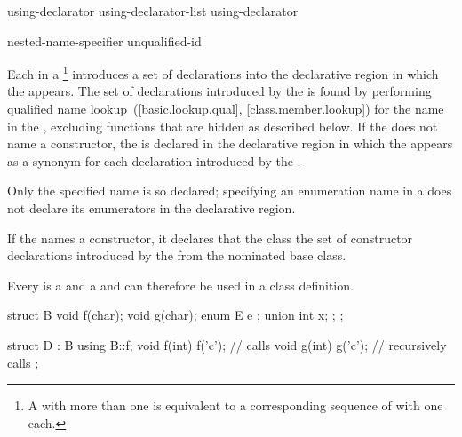 \begin{bnf}
\br
    using-declarator \br
    using-declarator-list \terminal{,} using-declarator 
\end{bnf}

\begin{bnf}
\br
     nested-name-specifier unqualified-id
\end{bnf}

\pnum
Each  in a %
\footnote{A  with more than one
 is equivalent to a corresponding sequence
of  with
one  each.}
introduces a set of declarations into the declarative region in
which the  appears.
The set of declarations introduced by the  is found by
performing qualified name lookup~(\ref{basic.lookup.qual}, \ref{class.member.lookup})
for the name in the ,
excluding functions that are hidden as described below.
If the  does not name a constructor,
the  is declared in the declarative region
in which the  appears
as a synonym for each declaration introduced by the .
\begin{note} Only the specified name is so declared;
specifying an enumeration name in a 
does not declare its enumerators
in the  declarative region.
\end{note}
%
If the  names a constructor,
it declares that the class  the set of constructor declarations
introduced by the  from the nominated base class.

\pnum
Every  is a  and a
 and can therefore be used in a class definition.
\begin{example}

\begin{codeblock}
struct B {
  void f(char);
  void g(char);
  enum E { e };
  union { int x; };
};

struct D : B {
  using B::f;
  void f(int) { f('c'); }       // calls 
  void g(int) { g('c'); }       // recursively calls 
};
\end{codeblock}
\end{example}


